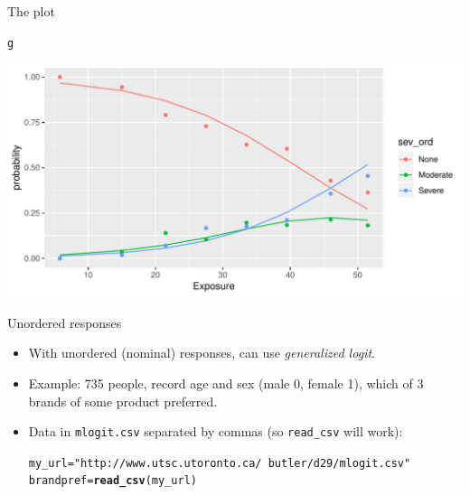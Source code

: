 \documentclass[unknownkeysallowed]{beamer}\usepackage[]{graphicx}\usepackage[]{color}
\makeatletter
\def\maxwidth{ %
  \ifdim\Gin@nat@width>\linewidth
    \linewidth
  \else
    \Gin@nat@width
  \fi
}
\newcommand{\hlstr}[1]{\textcolor[rgb]{0.192,0.494,0.8}{#1}}%
\newcommand{\hlstd}[1]{\textcolor[rgb]{0.345,0.345,0.345}{#1}}%
\newcommand{\hlkwb}[1]{\textcolor[rgb]{0.69,0.353,0.396}{#1}}%
\newcommand{\hlkwd}[1]{\textcolor[rgb]{0.737,0.353,0.396}{\textbf{#1}}}%
\newenvironment{kframe}{%
 \def\at@end@of@kframe{}%
 \ifinner\ifhmode%
  \def\at@end@of@kframe{\end{minipage}}%
  \begin{minipage}{\columnwidth}%
 \fi\fi%
 \def\FrameCommand##1{\hskip\@totalleftmargin \hskip-\fboxsep
 \colorbox{shadecolor}{##1}\hskip-\fboxsep
     \hskip-\linewidth \hskip-\@totalleftmargin \hskip\columnwidth}%
 \MakeFramed {\advance\hsize-\width
   \@totalleftmargin\z@ \linewidth\hsize
   \@setminipage}}%
 {\par\unskip\endMakeFramed%
 \at@end@of@kframe}
\newenvironment{knitrout}{}{} %
\makeatother
\begin{document}
\begin{frame}[fragile]{The plot}
  
\begin{knitrout}
\color{fgcolor}\begin{kframe}
\begin{alltt}
\hlstd{g}
\end{alltt}
\end{kframe}
\includegraphics[width=\maxwidth]{figure/unnamed-chunk-96-1} 

\end{knitrout}



\end{frame}





\begin{frame}[fragile]{Unordered responses}

  \begin{itemize}
  \item With unordered (nominal) responses, can use {\em generalized logit}.
  \item Example: 735 people, record age and sex (male 0, female 1), which of 3 brands of some product preferred.
  \item Data in \verb-mlogit.csv- separated by commas (so
    \texttt{read\_csv} will work):

 
\begin{knitrout}
\color{fgcolor}\begin{kframe}
\begin{alltt}
\hlstd{my_url}\hlkwb{=}\hlstr{"http://www.utsc.utoronto.ca/~butler/d29/mlogit.csv"}
\hlstd{brandpref}\hlkwb{=}\hlkwd{read_csv}\hlstd{(my_url)}
\end{alltt}


{\ttfamily\noindent\itshape\color{messagecolor}{\#\# Parsed with column specification:\\\#\# cols(\\\#\#\ \  brand = col\_double(),\\\#\#\ \  sex = col\_double(),\\\#\#\ \  age = col\_double()\\\#\# )}}\end{kframe}
\end{knitrout}
    

  \end{itemize}

\end{frame}
\end{document}
